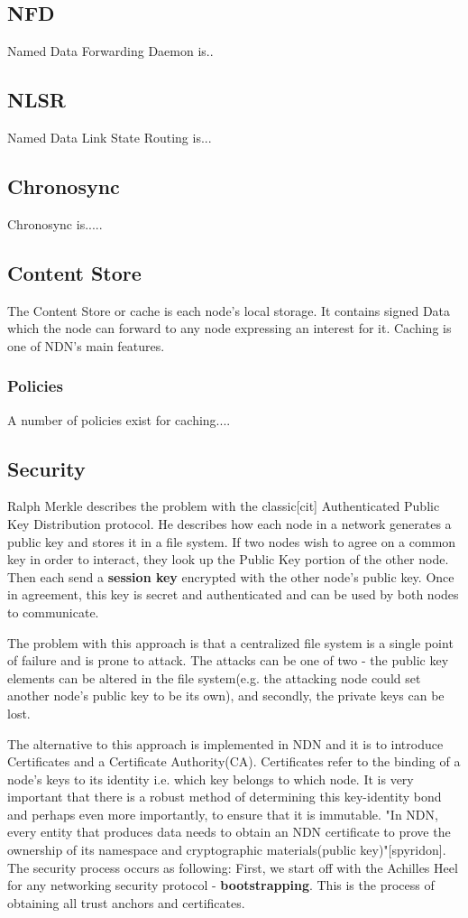 \subsection{NFD}
Named Data Forwarding Daemon is..
\subsection{NLSR}
Named Data Link State Routing is...
\subsection{Chronosync}
Chronosync is.....
\subsection{Content Store}
The Content Store or cache is each node's local storage. It contains signed Data which the node can forward to any node expressing an interest for it. Caching is one of NDN's main features.
\subsubsection{Policies}
A number of policies exist for caching....
\subsection{Security}
Ralph Merkle describes the problem with the classic[cit] Authenticated Public Key Distribution protocol. He describes how each node in a network generates a public key and stores it in a file system. If two nodes wish to agree on a common key in order to interact, they look up the Public Key portion of the other node. Then each send a \textbf{session key} encrypted with the other node's public key. Once in agreement, this key is secret and authenticated and can be used by both nodes to communicate. 

The problem with this approach is that a centralized file system is a single point of failure and is prone to attack. The attacks can be one of two - the public key elements can be altered in the file system(e.g. the attacking node could set another node's public key to be its own), and secondly, the private keys can be lost.

 The alternative to this approach is implemented in NDN and it is to introduce Certificates and a Certificate Authority(CA). Certificates refer to the binding of a node's keys to its identity i.e. which key belongs to which node. It is very important that there is a robust method of determining this key-identity bond and perhaps even more importantly, to ensure that it is immutable. "In NDN, every entity that produces data needs to obtain an NDN certificate to prove the ownership of its namespace and cryptographic materials(public key)"[spyridon].
 The security process occurs as following: First, we start off with the Achilles Heel for any networking security protocol - \textbf{bootstrapping}. This is the process of obtaining all trust anchors and certificates. 
	 
